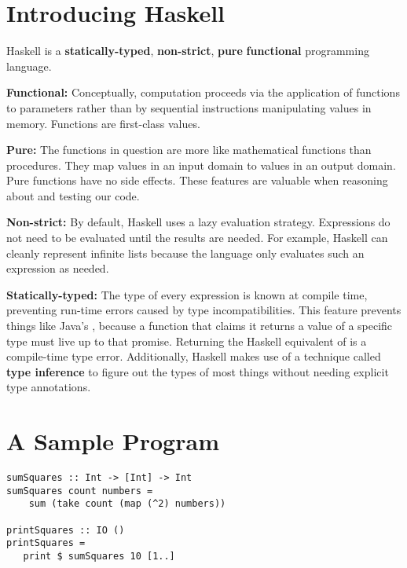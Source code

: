 \section{Introducing Haskell}
\begin{notelist}
\item Haskell is a \textbf{statically-typed}, \textbf{non-strict}, \textbf{pure} \textbf{functional}
      programming language.
	\begin{notelist}
	\item \textbf{Functional:} Conceptually, computation proceeds via the application of functions to parameters rather than by 
          sequential instructions manipulating values in memory. Functions are first-class values.
	\item \textbf{Pure:} The functions in question are more like mathematical functions than procedures. They map values in an input domain
          to values in an output domain. Pure functions have no side effects. These features are valuable when reasoning about
          and testing our code.
	\item \textbf{Non-strict:} By default, Haskell uses a lazy evaluation strategy. Expressions do not need to be evaluated until the 
          results are needed. For example, Haskell can cleanly represent infinite lists because the language only evaluates such
          an expression as needed.
    \item \textbf{Statically-typed:} The type of every expression is known at compile time, preventing run-time errors caused by type
          incompatibilities. This feature prevents things like Java's , because a function that claims it returns
          a value of a specific type must live up to that promise. Returning the Haskell equivalent of  is a compile-time
          type error. Additionally, Haskell makes use of a technique called \textbf{type inference} to figure out the types of most things
          without needing explicit type annotations.
	\end{notelist}
\end{notelist}
\pagebreak

\section{A Sample Program}

\begin{lstlisting}
sumSquares :: Int -> [Int] -> Int
sumSquares count numbers =
    sum (take count (map (^2) numbers))

printSquares :: IO ()
printSquares =
   print $ sumSquares 10 [1..]
\end{lstlisting}

